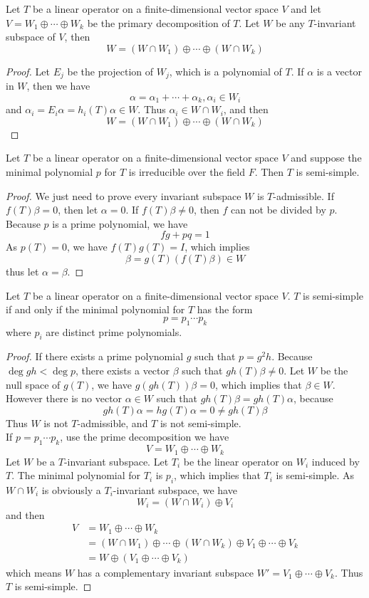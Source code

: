\documentclass{article}
\begin{document}
\begin{lem}
	Let $T$ be a linear operator on a finite-dimensional vector space $V$ and let $V=W_1\oplus\cdots\oplus W_k$ be the primary decomposition of $T$. Let $W$ be any $T$-invariant subspace of $V$, then
	\[W=(W\cap W_1)\oplus\cdots\oplus(W\cap W_k)\]
\end{lem}
\begin{proof}
	Let $E_j$ be the projection of $W_j$, which is a polynomial of $T$. If $\alpha$ is a vector in $W$, then we have
	\[\alpha=\alpha_1+\cdots+\alpha_k,\alpha_i\in W_i\]
	and $\alpha_i=E_i\alpha=h_i(T)\alpha\in W$. Thus $\alpha_i\in W\cap W_i$, and then
	\[W=(W\cap W_1)\oplus\cdots\oplus(W\cap W_k)\] 
\end{proof}
\begin{lem}
	Let $T$ be a linear operator on a finite-dimensional vector space $V$ and suppose the minimal polynomial $p$ for $T$ is irreducible over the field $F$. Then $T$ is semi-simple.
\end{lem}
\begin{proof}
	We just need to prove every invariant subspace $W$ is $T$-admissible. If $f(T)\beta=0$, then let $\alpha=0$. If $f(T)\beta\neq0$, then $f$ can not be divided by $p$. Because $p$ is a prime polynomial, we have
	\[fg+pq=1\]
	As $p(T)=0$, we have $f(T)g(T)=I$, which implies
	\[\beta=g(T)(f(T)\beta)\in W\]
	thus let $\alpha=\beta$.
\end{proof}
\begin{thm}
	Let $T$ be a linear operator on a finite-dimensional vector space $V$. $T$ is semi-simple if and only if the minimal polynomial for $T$ has the form
	\[p=p_1\cdots p_k\]
	where $p_i$ are distinct prime polynomials.
\end{thm}
\begin{proof}
	If there exists a prime polynomial $g$ such that $p=g^2h$. Because $\deg gh<\deg p$, there exists a vector $\beta$ such that $gh(T)\beta\neq0$. Let $W$ be the null space of $g(T)$, we have $g(gh(T))\beta=0$, which implies that $\beta\in W$. However there is no vector $\alpha\in W$ such that $gh(T)\beta=gh(T)\alpha$, because
	\[gh(T)\alpha=hg(T)\alpha=0\neq gh(T)\beta\]
	Thus $W$ is not $T$-admissible, and $T$ is not semi-simple.\\
	If $p=p_1\cdots p_k$, use the prime decomposition we have
	\[V=W_1\oplus\cdots\oplus W_k\]
	Let $W$ be a $T$-invariant subspace. Let $T_i$ be the linear operator on $W_i$ induced by $T$. The minimal polynomial for $T_i$ is $p_i$, which implies that $T_i$ is semi-simple. As $W\cap W_i$ is obviously a $T_i$-invariant subspace, we have
	\[W_i=(W\cap W_i)\oplus V_i\]
	and then
	\begin{align*}
		V&=W_1\oplus\cdots\oplus W_k\\
		&=(W\cap W_1)\oplus\cdots\oplus (W\cap W_k)\oplus V_1\oplus\cdots\oplus V_k\\
		&=W\oplus(V_1\oplus\cdots\oplus V_k)
	\end{align*}
	which means $W$ has a complementary invariant subspace $W'=V_1\oplus\cdots\oplus V_k$. Thus $T$ is semi-simple. 
\end{proof}
\end{document}
